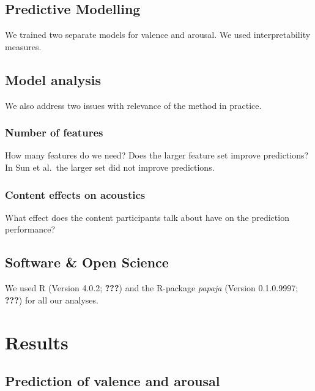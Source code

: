 \documentclass[english,man]{apa6}
\begin{document}
\hypertarget{predictive-modelling}{%
\subsection{Predictive Modelling}\label{predictive-modelling}}

We trained two separate models for valence and arousal.
We used interpretability measures.

\hypertarget{model-analysis}{%
\subsection{Model analysis}\label{model-analysis}}

We also address two issues with relevance of the method in practice.

\hypertarget{number-of-features}{%
\subsubsection{Number of features}\label{number-of-features}}

How many features do we need? Does the larger feature set improve predictions?
In Sun et al.~the larger set did not improve predictions.

\hypertarget{content-effects-on-acoustics}{%
\subsubsection{Content effects on acoustics}\label{content-effects-on-acoustics}}

What effect does the content participants talk about have on the prediction performance?

\hypertarget{software-open-science}{%
\subsection{Software \& Open Science}\label{software-open-science}}

We used R (Version 4.0.2; {\textbf{???}}) and the R-package \emph{papaja} (Version 0.1.0.9997; {\textbf{???}}) for all our analyses.

\hypertarget{results}{%
\section{Results}\label{results}}

\hypertarget{prediction-of-valence-and-arousal}{%
\subsection{Prediction of valence and arousal}\label{prediction-of-valence-and-arousal}}
\end{document}
